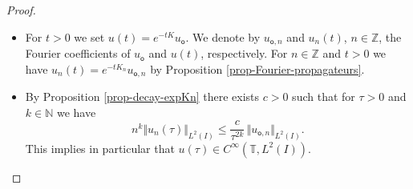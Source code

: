 \documentclass[JEP,XML,SOM,Unicode]{cedram}
\theoremstyle{plain}
\theoremstyle{definition}
\newcommand{\nr}[1]{\Vert #1\Vert}
\newcommand{\1}{\mathds 1}
\newcommand{\N}{\mathbb{N}}
\newcommand{\Z}{\mathbb{Z}}
\newcommand{\T}{\mathbb{T}}
\newcommand{\uo}{u_{\mathsf{o}}}
\newcommand{\uon}{u_{\mathsf{o},n}}
\begin{document}
\skpt
\begin{proof}
\begin{itemize}
\item
For $t > 0$ we set $u(t) = e^{-tK} \uo$. We denote by $\uon$ and $u_n(t)$, $n \in \Z$, the Fourier coefficients of $\uo$ and $u(t)$, respectively. For $n \in \Z$ and $t > 0$ we have $u_n(t) = e^{-t K_n} \uon$ by Proposition \ref{prop-Fourier-propagateurs}.

\item
By Proposition \ref{prop-decay-expKn} there exists $c > 0$ such that for $\tau > 0$ and $k \in \N$ we have
\begin{equation} \label{eq-estim-nk-un}
n^k \nr{u_n(\tau)}_{L^2(I)} \leq \frac c {\tau^{2k}}\, \nr{\uon}_{L^2(I)}.
\end{equation}
This implies in particular that $u(\tau) \in C^\infty(\T,L^2(I))$.


\end{itemize}
\end{proof}
\end{document}

